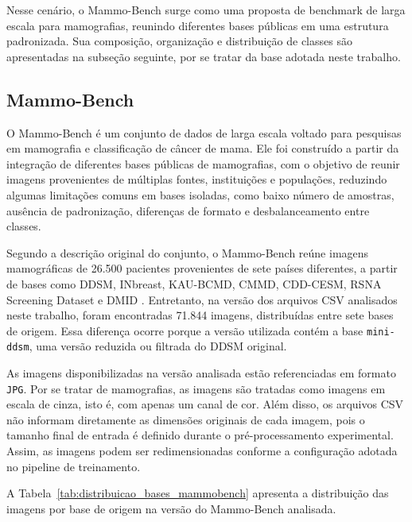 \documentclass[
    12pt,
    openright,
    oneside,
    a4paper,
    english,
    brazil
]{abntex2}
\begin{document}
Nesse cenário, o Mammo-Bench surge como uma proposta de benchmark de larga escala para mamografias, reunindo diferentes bases públicas em uma estrutura padronizada. Sua composição, organização e distribuição de classes são apresentadas na subseção seguinte, por se tratar da base adotada neste trabalho.

\subsection{Mammo-Bench}

O Mammo-Bench é um conjunto de dados de larga escala voltado para pesquisas em mamografia e classificação de câncer de mama. Ele foi construído a partir da integração de diferentes bases públicas de mamografias, com o objetivo de reunir imagens provenientes de múltiplas fontes, instituições e populações, reduzindo algumas limitações comuns em bases isoladas, como baixo número de amostras, ausência de padronização, diferenças de formato e desbalanceamento entre classes.

Segundo a descrição original do conjunto, o Mammo-Bench reúne imagens mamográficas de 26.500 pacientes provenientes de sete países diferentes, a partir de bases como DDSM, INbreast, KAU-BCMD, CMMD, CDD-CESM, RSNA Screening Dataset e DMID \cite{Bhole2025MammoBench}. Entretanto, na versão dos arquivos CSV analisados neste trabalho, foram encontradas 71.844 imagens, distribuídas entre sete bases de origem. Essa diferença ocorre porque a versão utilizada contém a base \texttt{mini-ddsm}, uma versão reduzida ou filtrada do DDSM original.

As imagens disponibilizadas na versão analisada estão referenciadas em formato \texttt{JPG}. Por se tratar de mamografias, as imagens são tratadas como imagens em escala de cinza, isto é, com apenas um canal de cor. Além disso, os arquivos CSV não informam diretamente as dimensões originais de cada imagem, pois o tamanho final de entrada é definido durante o pré-processamento experimental. Assim, as imagens podem ser redimensionadas conforme a configuração adotada no pipeline de treinamento.

A Tabela~\ref{tab:distribuicao_bases_mammobench} apresenta a distribuição das imagens por base de origem na versão do Mammo-Bench analisada.
\end{document}
